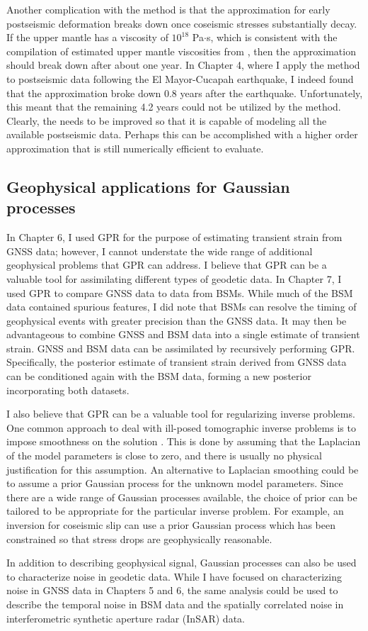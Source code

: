 Another complication with the \citet{Hines2016} method is that the
approximation for early postseismic deformation breaks down once
coseismic stresses substantially decay. If the upper mantle has a
viscosity of $10^{18}$ Pa$\cdot$s, which is consistent with the
compilation of estimated upper mantle viscosities from
\citep{Thatcher2008}, then the approximation should break down after
about one year. In Chapter 4, where I apply the \citet{Hines2016}
method to postseismic data following the El Mayor-Cucapah earthquake,
I indeed found that the approximation broke down 0.8 years after the
earthquake. Unfortunately, this meant that the remaining 4.2 years
could not be utilized by the \citet{Hines2016} method.  Clearly, the
\citet{Hines2016} needs to be improved so that it is capable of
modeling all the available postseismic data. Perhaps this can be
accomplished with a higher order approximation that is still
numerically efficient to evaluate.

\subsection{Geophysical applications for Gaussian processes}
In Chapter 6, I used GPR for the purpose of estimating transient
strain from GNSS data; however, I cannot understate the wide range of
additional geophysical problems that GPR can address. I believe that
GPR can be a valuable tool for assimilating different types of
geodetic data. In Chapter 7, I used GPR to compare GNSS data to data
from BSMs. While much of the BSM data contained spurious features, I
did note that BSMs can resolve the timing of geophysical events with
greater precision than the GNSS data. It may then be advantageous to
combine GNSS and BSM data into a single estimate of transient strain.
GNSS and BSM data can be assimilated by recursively performing GPR.
Specifically, the posterior estimate of transient strain derived from
GNSS data can be conditioned again with the BSM data, forming a new
posterior incorporating both datasets.

I also believe that GPR can be a valuable tool for regularizing
inverse problems. One common approach to deal with ill-posed
tomographic inverse problems is to impose smoothness on the solution
\citep{Aster2011}. This is done by assuming that the Laplacian of the
model parameters is close to zero, and there is usually no physical
justification for this assumption. An alternative to Laplacian
smoothing could be to assume a prior Gaussian process for the unknown
model parameters. Since there are a wide range of Gaussian processes
available, the choice of prior can be tailored to be appropriate for
the particular inverse problem. For example, an inversion for
coseismic slip can use a prior Gaussian process which has been
constrained so that stress drops are geophysically reasonable.

In addition to describing geophysical signal, Gaussian processes can
also be used to characterize noise in geodetic data. While I have
focused on characterizing noise in GNSS data in Chapters 5 and 6, the
same analysis could be used to describe the temporal noise in BSM data
and the spatially correlated noise in interferometric synthetic
aperture radar (InSAR) data.
